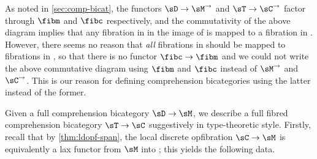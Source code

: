 \documentclass{amsart}
\begin{document}
\begin{rmk}
  As noted in \cref{sec:comp-bicat}, the functors $\sD\to\sM^\to$ and $\sT\to\sC^\to$ factor through $\fibm$ and $\fibc$ respectively, and the commutativity of the above diagram implies that any fibration in \sC in the image of \sT is mapped to a fibration in \sM.
  However, there seems no reason that \emph{all} fibrations in \sC should be mapped to fibrations in \sM, so that there is no functor $\fibc\to\fibm$ and we could not write the above commutative diagram using $\fibm$ and $\fibc$ instead of $\sM^\to$ and $\sC^\to$.
  This is our reason for defining comprehension bicategories using the latter instead of the former.
\end{rmk}

Given a full comprehension bicategory $\sD\to\sM$, we describe a full fibred comprehension bicategory $\sT\to\sC$ suggestively in type-theoretic style.
Firstly, recall that by \cref{thm:ldopf-span}, the local discrete opfibration $\sC\to\sM$ is equivalently a lax functor from $\sM$ into \cSpan; this yields the following data.
\end{document}
